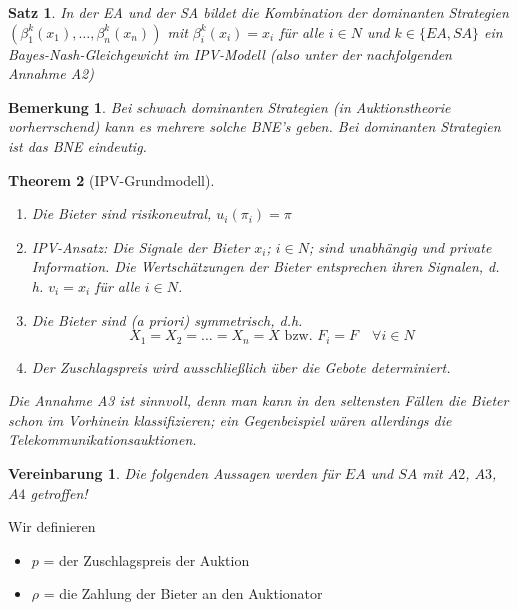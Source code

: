 \documentclass[12pt]{extreport} %
\theoremstyle{named}
\newtheorem{unnamedtheorem}{Theorem} \counterwithin{unnamedtheorem}{chapter}
\theoremstyle{nnamed}
\theoremstyle{itshape}
\newtheorem{satz}[unnamedtheorem]{Satz}
\theoremstyle{normal}
\newtheorem*{bemerkung}{Bemerkung}
\newtheorem*{vereinbarung}{Vereinbarung}
\begin{document}
\begin{satz}
	In der EA und der SA bildet die Kombination der dominanten Strategien $\left(\beta_{1}^{k}(x_{1}), \dotsc, \beta_{n}^{k}(x_{n}) \right)$ mit $\beta_{i}^{k}(x_{i}) = x_{i}$ für alle $i \in N$ und $k \in \{ EA, SA \}$ ein Bayes-Nash-Gleichgewicht im IPV-Modell (also unter der nachfolgenden Annahme A2)
\end{satz}

\begin{bemerkung}
	Bei schwach dominanten Strategien (in Auktionstheorie vorherrschend) kann es mehrere solche BNE's geben. Bei dominanten Strategien ist das BNE eindeutig.	
\end{bemerkung}

  
\begin{unnamedtheorem}[IPV-Grundmodell] ~\
	\begin{enumerate}
		\item[\hspace{0.5cm}A1:] Die Bieter sind risikoneutral, $u_{i}(\pi_{i}) = \pi$
		\item[\hspace{0.5cm}A2:] IPV-Ansatz: Die Signale der Bieter $x_i$; $i \in N$; sind unabhängig und private Information. Die Wertschätzungen der Bieter entsprechen ihren Signalen, d. h. $v_i = x_i$ für alle $i \in N$.
		\item[\hspace{0.5cm}A3:] Die Bieter sind (a priori) symmetrisch, d.h.$$ X_{1} = X_{2} = \dotsc = X_{n} = X \text{ bzw. } F_{i} = F \quad \forall i \in N $$
		\item[\hspace{0.5cm}A4:] Der Zuschlagspreis wird ausschließlich über die Gebote determiniert.
	\end{enumerate}
	Die Annahme A3 ist sinnvoll, denn man kann in den seltensten Fällen die Bieter schon im Vorhinein klassifizieren; ein Gegenbeispiel wären allerdings die Telekommunikationsauktionen.
\end{unnamedtheorem}

\begin{vereinbarung}
	Die folgenden Aussagen werden für $EA$ und $SA$ mit $A2$, $A3$, $A4$ getroffen!
\end{vereinbarung}

Wir definieren
\begin{itemize}
	\item $p$ = der Zuschlagspreis der Auktion
	\item $\rho$ = die Zahlung der Bieter an den Auktionator
\end{itemize}
\end{document}

